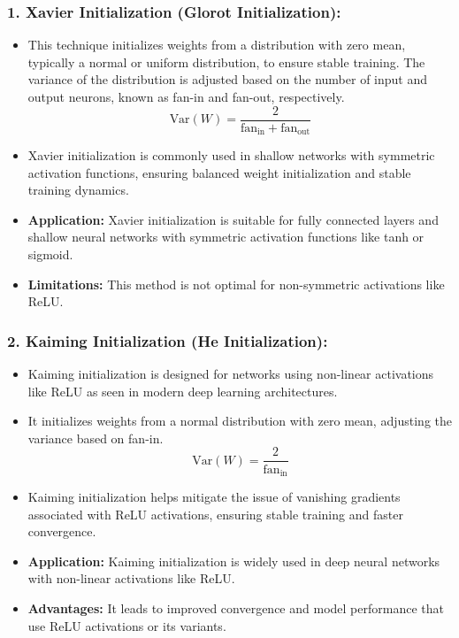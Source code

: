 \subsubsection{1. Xavier Initialization (Glorot Initialization):}
\begin{itemize}
  \item This technique initializes weights from a distribution with zero mean, typically a normal or uniform distribution, to ensure stable training. The variance of the distribution is adjusted based on the number of input and output neurons, known as fan-in and fan-out, respectively.
  \[ \text{Var}(W) = \frac{2}{\text{fan}_{\text{in}} + \text{fan}_{\text{out}}} \]
  \item Xavier initialization is commonly used in shallow networks with symmetric activation functions, ensuring balanced weight initialization and stable training dynamics.
  \item \textbf{Application:} Xavier initialization is suitable for fully connected layers and shallow neural networks with symmetric activation functions like tanh or sigmoid.
  \item \textbf{Limitations:} This method is not optimal for non-symmetric activations like ReLU.
\end{itemize}
\subsubsection{2. Kaiming Initialization (He Initialization):}
\begin{itemize}
  \item Kaiming initialization is designed for networks using non-linear activations like ReLU as seen in modern deep learning architectures.
  \item It initializes weights from a normal distribution with zero mean, adjusting the variance based on fan-in.
  \[ \text{Var}(W) = \frac{2}{\text{fan}_{\text{in}}} \]
  \item Kaiming initialization helps mitigate the issue of vanishing gradients associated with ReLU activations, ensuring stable training and faster convergence.
  \item \textbf{Application:} Kaiming initialization is widely used in deep neural networks with non-linear activations like ReLU.
  \item \textbf{Advantages:} It leads to improved convergence and model performance that use ReLU activations or its variants.
\end{itemize}
